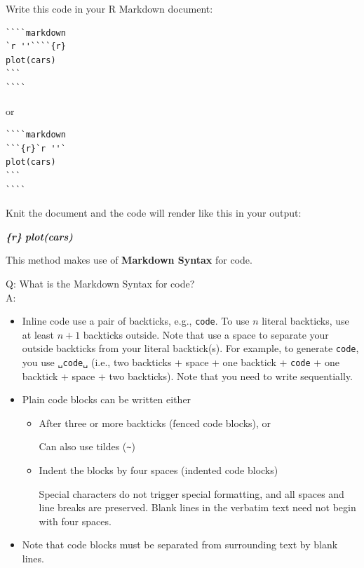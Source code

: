 \documentclass[
]{book}
\newenvironment{Shaded}{\begin{snugshade}}{\end{snugshade}}
\newcommand{\InformationTok}[1]{\textcolor[rgb]{0.56,0.35,0.01}{\textbf{\textit{#1}}}}
\theoremstyle{definition}
\theoremstyle{definition}
\theoremstyle{definition}
\theoremstyle{definition}
\theoremstyle{remark}
\begin{document}
Write this code in your R Markdown document:

\begin{verbatim}
````markdown
`r ''````{r}
plot(cars)
``` 
````
\end{verbatim}

or

\begin{verbatim}
````markdown
```{r}`r ''`
plot(cars)
``` 
````
\end{verbatim}

Knit the document and the code will render like this in your output:

\begin{Shaded}
\begin{Highlighting}[]
\InformationTok{\textasciigrave{}\textasciigrave{}\textasciigrave{}\{r\}}
\InformationTok{plot(cars)}
\InformationTok{\textasciigrave{}\textasciigrave{}\textasciigrave{}}
\end{Highlighting}
\end{Shaded}

This method makes use of \textbf{Markdown Syntax} for code.

Q: What is the Markdown Syntax for code?\\
A:

\begin{itemize}
\item
  Inline code use a pair of backticks, e.g., \texttt{\textasciigrave{}code\textasciigrave{}}. To use \(n\) literal backticks, use at least \(n+1\) backticks outside. Note that use a space to separate your outside backticks from your literal backtick(s). For example, to generate \texttt{\textasciigrave{}code\textasciigrave{}}, you use \texttt{\textasciigrave{}\textasciigrave{}␣\textasciigrave{}code\textasciigrave{}␣\textasciigrave{}\textasciigrave{}} (i.e., two backticks + space + one backtick + \texttt{code} + one backtick + space + two backticks). Note that you need to write sequentially.
\item
  Plain code blocks can be written either

  \begin{itemize}
  \item
    After three or more backticks (fenced code blocks), or

    Can also use tildes (\texttt{\textasciitilde{}})
  \item
    Indent the blocks by four spaces (indented code blocks)

    Special characters do not trigger special formatting, and all spaces and line breaks are preserved. Blank lines in the verbatim text need not begin with four spaces.
  \end{itemize}
\item
  Note that code blocks must be separated from surrounding text by blank lines.
\end{itemize}
\end{document}

